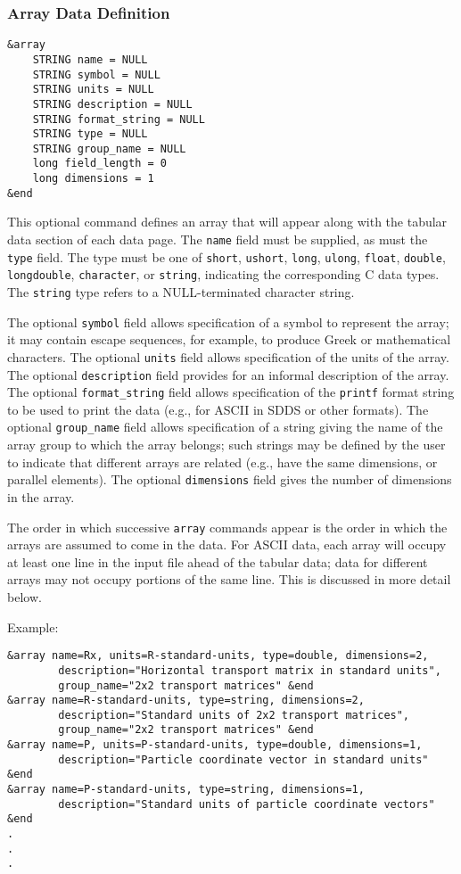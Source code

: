 \documentclass[11pt]{article}
\begin{document}
\subsubsection{Array Data Definition}

\begin{verbatim}
&array 
    STRING name = NULL
    STRING symbol = NULL
    STRING units = NULL
    STRING description = NULL
    STRING format_string = NULL
    STRING type = NULL
    STRING group_name = NULL
    long field_length = 0
    long dimensions = 1
&end
\end{verbatim}

This optional command defines an array that will appear along with the tabular data section of each data page.  The {\tt name} field must be supplied, as must the {\tt type} field.  The type must be one of {\tt short}, {\tt ushort}, {\tt long}, {\tt ulong}, {\tt float}, {\tt double}, {\tt longdouble}, {\tt character}, or {\tt string}, indicating the corresponding C data types.  The {\tt string} type refers to a NULL-terminated character string.

The optional {\tt symbol} field allows specification of a symbol to represent the array; it may contain escape sequences, for example, to produce Greek or mathematical characters.  The optional {\tt units} field allows specification of the units of the array.  The optional {\tt description} field provides for an informal description of the array.  The optional {\tt format\_string} field allows specification of the {\tt printf} format string to be used to print the data (e.g., for ASCII in SDDS or other formats).  The optional {\tt group\_name} field allows specification of a string giving the name of the array group to which the array belongs; such strings may be defined by the user to indicate that different arrays are related (e.g., have the same dimensions, or parallel elements). The optional {\tt dimensions} field gives the number of dimensions in the array.

The order in which successive {\tt array} commands appear is the order in which the arrays are assumed to come in the data.  For ASCII data, each array will occupy at least one line in the input file ahead of the tabular data; data for different arrays may not occupy portions of the same line.  This is discussed in more detail below.

Example:
\begin{verbatim}
&array name=Rx, units=R-standard-units, type=double, dimensions=2,
        description="Horizontal transport matrix in standard units",
        group_name="2x2 transport matrices" &end
&array name=R-standard-units, type=string, dimensions=2, 
        description="Standard units of 2x2 transport matrices",
        group_name="2x2 transport matrices" &end
&array name=P, units=P-standard-units, type=double, dimensions=1, 
        description="Particle coordinate vector in standard units" &end
&array name=P-standard-units, type=string, dimensions=1, 
        description="Standard units of particle coordinate vectors" &end
.
.
.
\end{verbatim}
\end{document}
